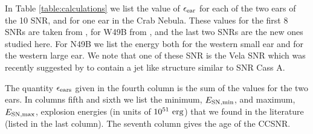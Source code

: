 \documentclass[12pt,preprint,a4paper]{aastex}
\def \erg{~\rm{erg}}
\begin{document}
In Table \ref{table:calculations} we list the value of $\epsilon_{\rm ear}$ for each of the two ears of the 10 SNR, and for one ear in the Crab Nebula. These values for the first 8 SNRs are taken from \cite{GrichenerSoker2017}, for W49B from \cite{BearSoker2017}, and the last two SNRs are the new ones studied here. For N49B we list the energy both for the western small ear and for the western large ear.
We note that one of these SNR is the Vela SNR which was recently suggested by \cite{Garciaetal2017} to contain a jet like structure similar to SNR Cass A.

The quantity $\epsilon_{\rm ears}$ given in the fourth column is the sum of the values for the two ears. In columns fifth and sixth we list the minimum, $E_{\rm SN, min}$, and maximum, $E_{\rm SN, max}$, explosion energies (in units of $10^{51} \erg$) that we found in the literature (listed in the last column). 
The seventh column gives the age of the CCSNR.  
\end{document}

